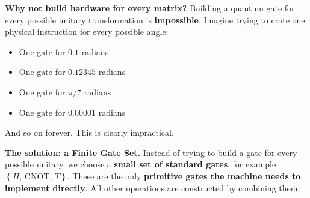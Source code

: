 \highspace
\textcolor{Green3}{ \textbf{Why not build hardware for every matrix?}} Building a quantum gate for every possible unitary transformation is \textbf{impossible}. Imagine trying to crate one physical instruction for every possible angle:
\begin{itemize}
    \item One gate for $0.1$ radians
    \item One gate for $0.12345$ radians
    \item One gate for $\pi/7$ radians
    \item One gate for $0.00001$ radians
\end{itemize}
And so on forever. This is clearly impractical.

\highspace
\textcolor{Green3}{ \textbf{The solution: a Finite Gate Set.}} Instead of trying to build a gate for every possible unitary, we choose a \textbf{small set of standard gates}, for example $\left\{H, \, \text{CNOT}, \, T\right\}$. These are the only \textbf{primitive gates the machine needs to implement directly}. All other operations are constructed by combining them.

\newpage

